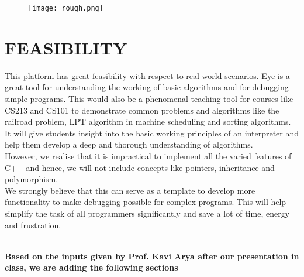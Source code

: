 \documentclass{article}
\begin{document}
\begin{figure}[H]
\centering
\texttt{[image: rough.png]}
\label{fig:rough}
\end{figure}


\section{FEASIBILITY} 
This platform has great feasibility with respect to real-world scenarios. Eye is a great tool for understanding the working of basic algorithms and for debugging simple programs. This would also be a phenomenal teaching tool for courses like CS213 and CS101 to demonstrate common problems and algorithms like the railroad problem, LPT algorithm in machine scheduling and sorting algorithms. It will give students insight into the basic working principles of an interpreter and help them develop a deep and thorough understanding of algorithms.\\
However, we realise that it is impractical to implement all the varied features of C++ and hence, we will not include concepts like pointers, inheritance and polymorphism.\\
We strongly believe that this can serve as a template to develop more functionality to make debugging possible for complex programs. This will help simplify the task of all programmers significantly and save a lot of time, energy and frustration. 

\\
\textbf{{\large Based on the inputs given by Prof. Kavi Arya after our presentation in class, we are adding the following sections}}
\end{document}
